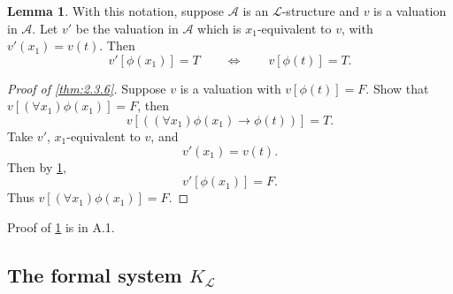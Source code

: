 \documentclass{article}
\newcommand{\A}{\mathcal{A}}
\renewcommand{\L}{\mathcal{L}}
\newcommand{\rb}[1]{\left( #1 \right)}
\renewcommand{\sb}[1]{\left[ #1 \right]}
\newcommand{\impb}[2]{\rb{#1 \rightarrow #2}}
\newcommand{\fab}[1]{\rb{\forall #1}}
\theoremstyle{definition}\newtheorem{definition}{Definition}[subsection]
\theoremstyle{definition}\newtheorem{remark1}[definition]{Remark}
\theoremstyle{definition}\newtheorem{example1}[definition]{Example}
\theoremstyle{definition}\newtheorem*{remark2}{Remark}
\theoremstyle{definition}\newtheorem*{example2}{Example}
\theoremstyle{definition}\newtheorem*{note}{Note}
\theoremstyle{definition}\newtheorem*{notation}{Notation}
\newtheorem{lemma}[definition]{Lemma}
\begin{document}
\begin{lemma}
\label{lem:2.3.7}
With this notation, suppose $ \A $ is an $ \L $-structure and $ v $ is a valuation in $ \A $. Let $ v' $ be the valuation in $ \A $ which is $ x_1 $-equivalent to $ v $, with $ v'\rb{x_1} = v\rb{t} $. Then
$$ v'\sb{\phi\rb{x_1}} = T \qquad \iff \qquad v\sb{\phi\rb{t}} = T. $$
\end{lemma}

\begin{proof}[Proof of \ref{thm:2.3.6}]
Suppose $ v $ is a valuation with $ v\sb{\phi\rb{t}} = F $. Show that $ v\sb{\fab{x_1}\phi\rb{x_1}} = F $, then
$$ v\sb{\impb{\fab{x_1}\phi\rb{x_1}}{\phi\rb{t}}} = T. $$
Take $ v' $, $ x_1 $-equivalent to $ v $, and
$$ v'\rb{x_1} = v\rb{t}. $$
Then by \ref{lem:2.3.7},
$$ v'\sb{\phi\rb{x_1}} = F. $$
Thus $ v\sb{\fab{x_1}\phi\rb{x_1}} = F $.
\end{proof}

Proof of \ref{lem:2.3.7} is in A.1.

\subsection{The formal system $ K_{\L} $}
\end{document}
